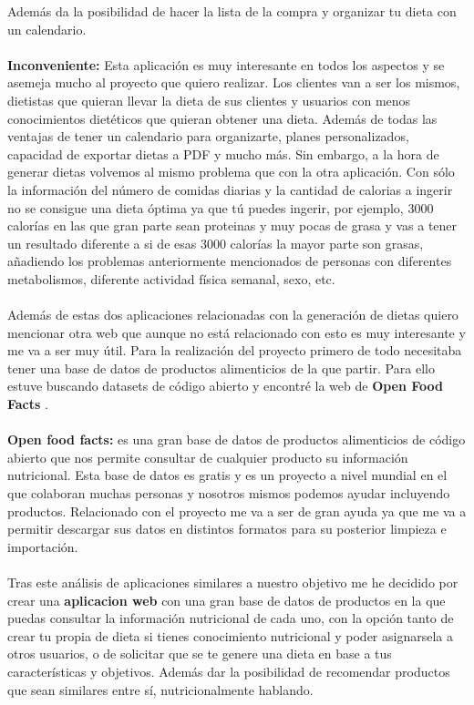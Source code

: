 Además da la posibilidad de hacer la lista de la compra y organizar tu dieta con un calendario.
\\\\
\textbf{Inconveniente:}
Esta aplicación es muy interesante en todos los aspectos y se asemeja mucho al proyecto que quiero realizar. Los clientes van a ser los mismos, dietistas que quieran llevar la dieta de sus clientes
y usuarios con menos conocimientos dietéticos que quieran obtener una dieta. Además de todas las ventajas de tener un calendario para organizarte, planes personalizados, capacidad de exportar dietas a PDF y mucho más.
Sin embargo, a la hora de generar dietas volvemos al mismo problema que con la otra aplicación. Con sólo la información del número de comidas diarias y la cantidad de calorias a ingerir
no se consigue una dieta óptima ya que tú puedes ingerir, por ejemplo, 3000 calorías en las que gran parte sean proteinas y muy pocas de grasa y vas a tener un resultado diferente a si de 
esas 3000 calorías la mayor parte son grasas, añadiendo los problemas anteriormente mencionados de personas con diferentes metabolismos, diferente actividad física semanal, sexo, etc.
\\\\ 
Además de estas dos aplicaciones relacionadas con la generación de dietas quiero mencionar otra web que aunque no está relacionado con esto es muy interesante y me va a ser muy útil.
Para la realización del proyecto primero de todo necesitaba tener una base de datos de productos alimenticios de la que partir. Para ello estuve buscando datasets de código abierto y encontré la web de \textbf{Open Food Facts} \cite{OpenFoodFacts}.
\\\\
\textbf{Open food facts:} es una gran base de datos de productos alimenticios de código abierto que nos permite consultar de cualquier producto su información nutricional.
Esta base de datos es gratis y es un proyecto a nivel mundial en el que colaboran muchas personas y nosotros mismos podemos ayudar incluyendo productos.
Relacionado con el proyecto me va a ser de gran ayuda ya que me va a permitir descargar sus datos en distintos formatos para su posterior limpieza e importación.
\\\\
Tras este análisis de aplicaciones similares a nuestro objetivo me he decidido por crear una \textbf{aplicacion web} con una gran base de datos de productos en la que puedas consultar
la información nutricional de cada uno, con la opción tanto de crear tu propia de dieta si tienes conocimiento nutricional y poder asignarsela a otros usuarios, o de solicitar que 
se te genere una dieta en base a tus características y objetivos. Además dar la posibilidad de recomendar productos que sean similares entre sí, nutricionalmente hablando.


